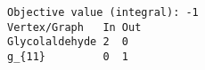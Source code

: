 \begin{verbatim}
Objective value (integral): -1
Vertex/Graph   In Out 
Glycolaldehyde 2  0   
g_{11}         0  1   
\end{verbatim}
